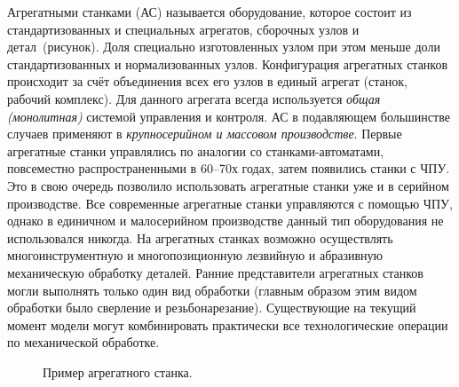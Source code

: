 Агрегатными станками (АС) называется оборудование, которое состоит из стандартизованных и специальных агрегатов, сборочных узлов и детал~(рисунок). Доля специально изготовленных узлом при этом меньше доли стандартизованных и нормализованных узлов. Конфигурация агрегатных станков происходит за счёт объединения всех его узлов в единый агрегат (станок, рабочий комплекс). Для данного агрегата всегда используется \textit{общая (монолитная)} системой управления и контроля. АС в подавляющем большинстве случаев применяют в \textit{крупносерийном и массовом производстве}. Первые агрегатные станки управлялись по аналогии со станками-автоматами, повсеместно распространенными в 60--70х годах, затем появились станки с ЧПУ. Это в свою очередь позволило использовать агрегатные станки уже и в серийном производстве. Все современные агрегатные станки управляются с помощью ЧПУ, однако в единичном и малосерийном производстве данный тип оборудования не использовался никогда. На агрегатных станках возможно осуществлять многоинструментную и многопозиционную лезвийную и абразивную механическую обработку деталей. Ранние представители агрегатных станков могли выполнять только один вид обработки (главным образом этим видом обработки было сверление и резьбонарезание). Существующие на текущий момент модели могут комбинировать практически все технологические операции по механической обработке.

\begin{figure}[ht]
	\caption{Пример агрегатного станка.}\label{fig:agr-example}
\end{figure}

